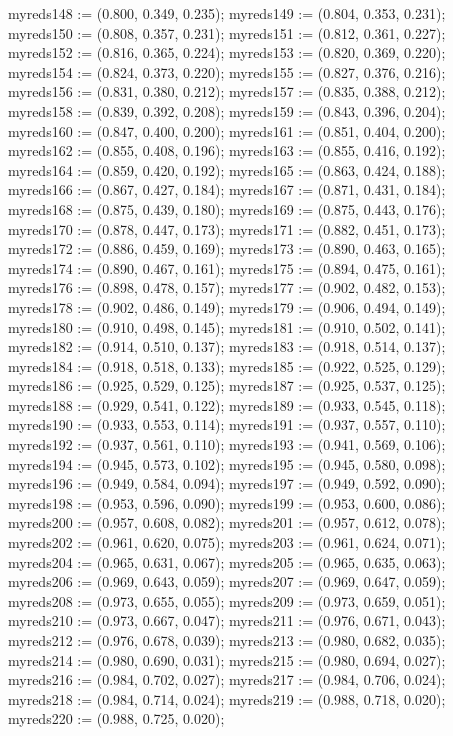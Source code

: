 myreds148 := (0.800, 0.349, 0.235);
myreds149 := (0.804, 0.353, 0.231);
myreds150 := (0.808, 0.357, 0.231);
myreds151 := (0.812, 0.361, 0.227);
myreds152 := (0.816, 0.365, 0.224);
myreds153 := (0.820, 0.369, 0.220);
myreds154 := (0.824, 0.373, 0.220);
myreds155 := (0.827, 0.376, 0.216);
myreds156 := (0.831, 0.380, 0.212);
myreds157 := (0.835, 0.388, 0.212);
myreds158 := (0.839, 0.392, 0.208);
myreds159 := (0.843, 0.396, 0.204);
myreds160 := (0.847, 0.400, 0.200);
myreds161 := (0.851, 0.404, 0.200);
myreds162 := (0.855, 0.408, 0.196);
myreds163 := (0.855, 0.416, 0.192);
myreds164 := (0.859, 0.420, 0.192);
myreds165 := (0.863, 0.424, 0.188);
myreds166 := (0.867, 0.427, 0.184);
myreds167 := (0.871, 0.431, 0.184);
myreds168 := (0.875, 0.439, 0.180);
myreds169 := (0.875, 0.443, 0.176);
myreds170 := (0.878, 0.447, 0.173);
myreds171 := (0.882, 0.451, 0.173);
myreds172 := (0.886, 0.459, 0.169);
myreds173 := (0.890, 0.463, 0.165);
myreds174 := (0.890, 0.467, 0.161);
myreds175 := (0.894, 0.475, 0.161);
myreds176 := (0.898, 0.478, 0.157);
myreds177 := (0.902, 0.482, 0.153);
myreds178 := (0.902, 0.486, 0.149);
myreds179 := (0.906, 0.494, 0.149);
myreds180 := (0.910, 0.498, 0.145);
myreds181 := (0.910, 0.502, 0.141);
myreds182 := (0.914, 0.510, 0.137);
myreds183 := (0.918, 0.514, 0.137);
myreds184 := (0.918, 0.518, 0.133);
myreds185 := (0.922, 0.525, 0.129);
myreds186 := (0.925, 0.529, 0.125);
myreds187 := (0.925, 0.537, 0.125);
myreds188 := (0.929, 0.541, 0.122);
myreds189 := (0.933, 0.545, 0.118);
myreds190 := (0.933, 0.553, 0.114);
myreds191 := (0.937, 0.557, 0.110);
myreds192 := (0.937, 0.561, 0.110);
myreds193 := (0.941, 0.569, 0.106);
myreds194 := (0.945, 0.573, 0.102);
myreds195 := (0.945, 0.580, 0.098);
myreds196 := (0.949, 0.584, 0.094);
myreds197 := (0.949, 0.592, 0.090);
myreds198 := (0.953, 0.596, 0.090);
myreds199 := (0.953, 0.600, 0.086);
myreds200 := (0.957, 0.608, 0.082);
myreds201 := (0.957, 0.612, 0.078);
myreds202 := (0.961, 0.620, 0.075);
myreds203 := (0.961, 0.624, 0.071);
myreds204 := (0.965, 0.631, 0.067);
myreds205 := (0.965, 0.635, 0.063);
myreds206 := (0.969, 0.643, 0.059);
myreds207 := (0.969, 0.647, 0.059);
myreds208 := (0.973, 0.655, 0.055);
myreds209 := (0.973, 0.659, 0.051);
myreds210 := (0.973, 0.667, 0.047);
myreds211 := (0.976, 0.671, 0.043);
myreds212 := (0.976, 0.678, 0.039);
myreds213 := (0.980, 0.682, 0.035);
myreds214 := (0.980, 0.690, 0.031);
myreds215 := (0.980, 0.694, 0.027);
myreds216 := (0.984, 0.702, 0.027);
myreds217 := (0.984, 0.706, 0.024);
myreds218 := (0.984, 0.714, 0.024);
myreds219 := (0.988, 0.718, 0.020);
myreds220 := (0.988, 0.725, 0.020);
